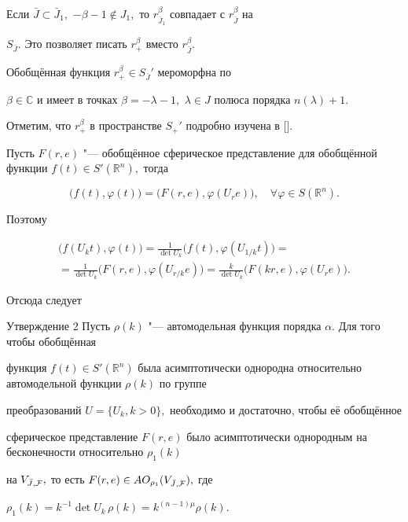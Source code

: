 \smallskip



\begin{remark} Если $\bar{J}\subset \bar{J}_1,$ $-\beta-1 \notin J_1,$ то $r_{\bar{J}_1}^{\beta}$ совпадает с $r_{\bar{J}}^{\beta}$ на

$S_{\bar{J}}.$ Это позволяет писать $r_{+}^{\beta}$ вместо $r_{\bar{J}}^{\beta}$.

Обобщённая функция $r_{+}^{\beta} \in S_{\bar{J}}'$ мероморфна по

$\beta \in \mathbb C$ и имеет в точках $\beta =-\lambda-1,$ $ \lambda \in J$ полюса порядка $n(\lambda)+1.$

\end{remark}



\smallskip



Отметим, что $r_{+}^{\beta}$ в  пространстве $S_{+}'$ подробно изучена в [].



Пусть $F(r,e)$ "--- обобщённое сферическое представление для обобщённой функции $f(t)\in S'(\mathbb R^n),$ тогда

$$\bigr(f(t), \varphi(t)\bigl)= \bigr( F(r,e),\varphi(U_re) \bigl), \quad \forall \varphi \in S(\mathbb R^n).$$

Поэтому

\begin{multline*}

\bigl(f(U_kt),\varphi(t)\bigr)=\frac1{\det U_k} \bigl(f(t),\varphi(U_{1/{k}}t)\bigr)=\\

=\frac1{\det U_k}\bigl( F(r,e),\varphi (U_{{r}/{k}}e) \bigr)=

\frac{k}{\det U_k}\bigl(F(kr,e),\varphi(U_re)\bigr).

\end{multline*}

Отсюда следует



\begin{newthm}{Утверждение 2} Пусть $\rho(k)$ "--- автомодельная функция порядка $\alpha.$ Для того чтобы обобщённая

функция $f(t)\in S'(\mathbb R^n)$ была асимптотически однородна относительно автомодельной функции $\rho(k)$ по группе

преобразований $U=\{U_k, k>0\},$ необходимо и достаточно{\rm,} чтобы её обобщённое

сферическое представление $F(r, e)$ было асимптотически однородным на бесконечности относительно $\rho_1(k)$

на $V_{\bar{J},{\cal F}},$ то есть $F(r,e)\in AO_{\rho_1}(V_{\bar{J},{\cal F}}),$ где

$\rho_1(k)=k^{-1}{\det U_k} \, \rho(k)=k^{(n-1)\mu}\rho(k).$

\end{newthm}







